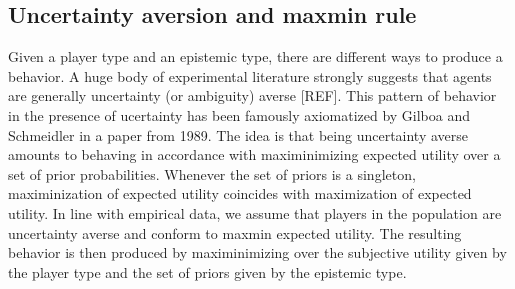 \documentclass[fleqn,reqno,11pt]{article}
\begin{document}
\subsection{Uncertainty aversion and maxmin rule}

Given a player type and an epistemic type, there are different ways to produce a behavior. A huge body of experimental literature strongly suggests that agents are generally uncertainty (or ambiguity) averse [REF]. This pattern of behavior in the presence of ucertainty has been famously axiomatized by Gilboa and Schmeidler in a paper from 1989. The idea is that being uncertainty averse amounts to behaving in accordance with maximinimizing expected utility over a set of prior probabilities. Whenever the set of priors is a singleton, maximinization of expected utility coincides with maximization of expected utility. In line with empirical data, we assume that players in the population are uncertainty averse and conform to maxmin expected utility. The resulting behavior is then produced by maximinimizing over the subjective utility given by the player type and the set of priors given by the epistemic type. \\
\end{document}
